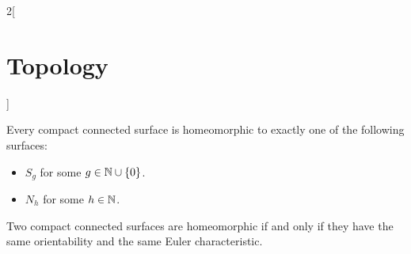 \documentclass[../../../main_math.tex]{subfiles}
\begin{document}
\begin{multicols}{2}[\section{Topology}]
\begin{theorem}
    Every compact connected surface is homeomorphic to exactly one of the following surfaces:
    \begin{itemize}
      \item $S_g$ for some $g\in\mathbb{N}\cup\{0\}$.
      \item $N_h$ for some $h\in\mathbb{N}$.
    \end{itemize}
  \end{theorem}
  \begin{corollary}
    Two compact connected surfaces are homeomorphic if and only if they have the same orientability and the same Euler characteristic.
  \end{corollary}
\end{multicols}
\end{document}
